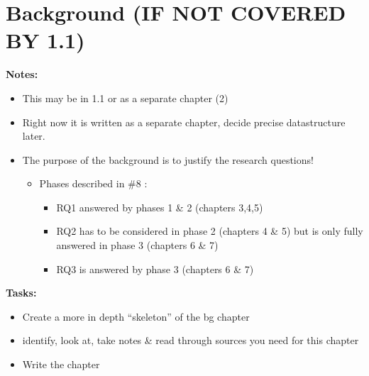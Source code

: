 \chapter{Background    (IF NOT COVERED BY 1.1)} \label{bg}
\textbf{Notes:}\\ 
\begin{itemize}
	\item This may be in 1.1 or as a separate chapter (2)

	\item Right now it is written as a separate chapter, decide precise 
	datastructure later.

	\item The purpose of the background is to justify the research 
	questions!
	\begin{itemize}
		\item Phases described in \#8 :
		\begin{itemize}
			\item RQ1 answered by phases 1 \& 2 (chapters 3,4,5)
			\item RQ2 has to be considered in phase 2 (chapters 4 
			\& 5) but is only fully answered in phase 3 (chapters 6 
			\& 7) 
			\item RQ3 is answered by phase 3 (chapters 6 \& 7)
		\end{itemize}
	\end{itemize}
\end{itemize}

\textbf{Tasks:}\\
\begin{itemize}
	\item Create a more in depth ``skeleton'' of the bg chapter

	\item identify, look at, take notes \& read through sources you need 
	for this chapter

	\item Write the chapter
\end{itemize} 
